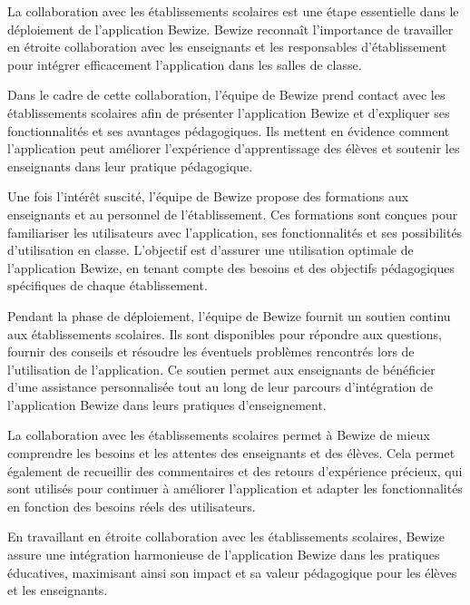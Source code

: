     La collaboration avec les établissements scolaires est une étape essentielle dans le déploiement de l'application Bewize. Bewize reconnaît l'importance de travailler en étroite collaboration avec les enseignants et les responsables d'établissement pour intégrer efficacement l'application dans les salles de classe.

    Dans le cadre de cette collaboration, l'équipe de Bewize prend contact avec les établissements scolaires afin de présenter l'application Bewize et d'expliquer ses fonctionnalités et ses avantages pédagogiques. Ils mettent en évidence comment l'application peut améliorer l'expérience d'apprentissage des élèves et soutenir les enseignants dans leur pratique pédagogique.
    
    Une fois l'intérêt suscité, l'équipe de Bewize propose des formations aux enseignants et au personnel de l'établissement. Ces formations sont conçues pour familiariser les utilisateurs avec l'application, ses fonctionnalités et ses possibilités d'utilisation en classe. L'objectif est d'assurer une utilisation optimale de l'application Bewize, en tenant compte des besoins et des objectifs pédagogiques spécifiques de chaque établissement.
    
    Pendant la phase de déploiement, l'équipe de Bewize fournit un soutien continu aux établissements scolaires. Ils sont disponibles pour répondre aux questions, fournir des conseils et résoudre les éventuels problèmes rencontrés lors de l'utilisation de l'application. Ce soutien permet aux enseignants de bénéficier d'une assistance personnalisée tout au long de leur parcours d'intégration de l'application Bewize dans leurs pratiques d'enseignement.
    
    La collaboration avec les établissements scolaires permet à Bewize de mieux comprendre les besoins et les attentes des enseignants et des élèves. Cela permet également de recueillir des commentaires et des retours d'expérience précieux, qui sont utilisés pour continuer à améliorer l'application et adapter les fonctionnalités en fonction des besoins réels des utilisateurs.
    
    En travaillant en étroite collaboration avec les établissements scolaires, Bewize assure une intégration harmonieuse de l'application Bewize dans les pratiques éducatives, maximisant ainsi son impact et sa valeur pédagogique pour les élèves et les enseignants.


